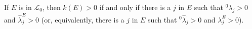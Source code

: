 If $E$ is in $\mathcal{L}_0$, then $k(E) > 0$ if and only if there is a $j$ in $E$ such that ${}^0\lambda_j > 0$ and $\hat{\lambda}_j^E > 0$ (or, equivalently, there is a $j$ in $E$ such that ${}^0\hat{\lambda}_j > 0$ and $\lambda_j^E > 0$).
